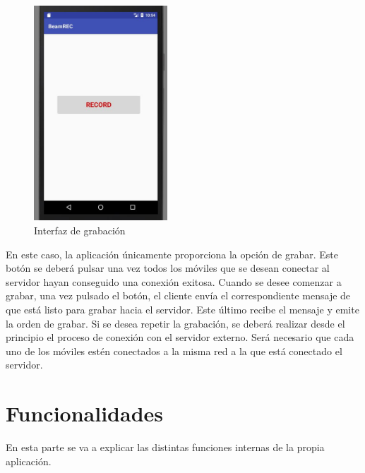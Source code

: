 \documentclass[a4paper,11pt]{book}
\begin{document}
	\begin{figure}[hbtp]
	\centering
	\includegraphics[width = 5cm]{FIGURAS/interfaz2.JPG}
	\caption{Interfaz de grabación}
	\end{figure}
	En este caso, la aplicación únicamente proporciona la opción de grabar. Este botón se deberá pulsar una vez todos los móviles que se desean conectar al servidor hayan conseguido una conexión exitosa. Cuando se desee comenzar a grabar, una vez pulsado el botón, el cliente envía el correspondiente mensaje de que está listo para grabar hacia el servidor. Este último recibe el mensaje y emite la orden de grabar. Si se desea repetir la grabación, se deberá realizar desde el principio el proceso de conexión con el servidor externo. Será necesario que cada uno de los móviles estén conectados a la misma red a la que está conectado el servidor.

	\section{Funcionalidades}
	En esta parte se va a explicar las distintas funciones internas de la propia aplicación.
	
\end{document}
